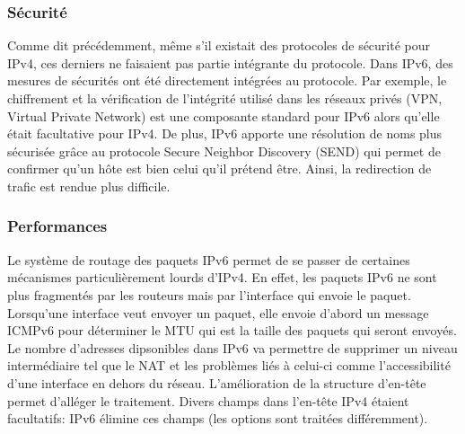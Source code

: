 \subsubsection{Sécurité}
Comme dit précédemment, même s'il existait des protocoles de sécurité pour
IPv4, ces derniers ne faisaient pas partie intégrante du protocole.  Dans IPv6,
des mesures de sécurités ont été directement intégrées au protocole.  Par
exemple, le chiffrement et la vérification de l'intégrité utilisé dans les
réseaux privés (VPN, Virtual Private Network) est une composante standard pour
IPv6 alors qu'elle était facultative pour IPv4. 
\smallbreak
De plus, IPv6 apporte une résolution de noms plus sécurisée grâce au protocole
Secure Neighbor Discovery (SEND) qui permet de confirmer qu'un hôte est bien
celui qu'il prétend être. Ainsi, la redirection de trafic est rendue plus
difficile.
\subsubsection{Performances}
Le système de routage des paquets IPv6 permet de se passer de certaines
mécanismes particulièrement lourds d'IPv4. En effet, les paquets IPv6 ne
sont plus fragmentés par les routeurs mais par l'interface qui envoie le
paquet. Lorsqu'une interface veut envoyer un paquet, elle envoie d'abord un
message ICMPv6 pour déterminer le MTU qui est la taille des paquets qui seront
envoyés.
\smallbreak
Le nombre d'adresses dipsonibles dans IPv6 va permettre de
supprimer un niveau intermédiaire tel que le NAT et les problèmes liés à
celui-ci comme l'accessibilité d'une interface en dehors du réseau.
\smallbreak
L'amélioration de la structure d'en-tête permet d'alléger le traitement. Divers
champs dans l'en-tête IPv4 étaient facultatifs: IPv6 élimine ces champs (les
options sont traitées différemment).
